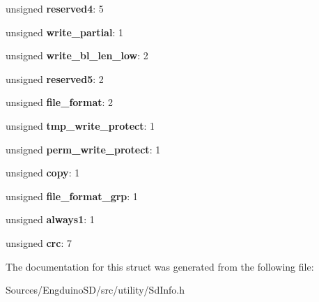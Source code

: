 \begin{DoxyCompactItemize}
\item 
\hypertarget{struct_c_s_d_v1_a8c0aa397613ce7723033f0f8edccf458}{}unsigned {\bfseries reserved4}\+: 5\label{struct_c_s_d_v1_a8c0aa397613ce7723033f0f8edccf458}

\item 
\hypertarget{struct_c_s_d_v1_a24149a92c75ebed1c824e4301e1fad40}{}unsigned {\bfseries write\+\_\+partial}\+: 1\label{struct_c_s_d_v1_a24149a92c75ebed1c824e4301e1fad40}

\item 
\hypertarget{struct_c_s_d_v1_a57c6fb1515a4377af6c642c5d66f7a35}{}unsigned {\bfseries write\+\_\+bl\+\_\+len\+\_\+low}\+: 2\label{struct_c_s_d_v1_a57c6fb1515a4377af6c642c5d66f7a35}

\item 
\hypertarget{struct_c_s_d_v1_ab19ce641d4e1ed12241f3519836c30dc}{}unsigned {\bfseries reserved5}\+: 2\label{struct_c_s_d_v1_ab19ce641d4e1ed12241f3519836c30dc}

\item 
\hypertarget{struct_c_s_d_v1_a537754d4987f7c51d5a67b66d8870cf5}{}unsigned {\bfseries file\+\_\+format}\+: 2\label{struct_c_s_d_v1_a537754d4987f7c51d5a67b66d8870cf5}

\item 
\hypertarget{struct_c_s_d_v1_a79be71efc43a4706a1f1fd6023f574db}{}unsigned {\bfseries tmp\+\_\+write\+\_\+protect}\+: 1\label{struct_c_s_d_v1_a79be71efc43a4706a1f1fd6023f574db}

\item 
\hypertarget{struct_c_s_d_v1_a56bd241d539d5a48b97a64587908e55d}{}unsigned {\bfseries perm\+\_\+write\+\_\+protect}\+: 1\label{struct_c_s_d_v1_a56bd241d539d5a48b97a64587908e55d}

\item 
\hypertarget{struct_c_s_d_v1_a59b32955a2955914ad68a5207da3634e}{}unsigned {\bfseries copy}\+: 1\label{struct_c_s_d_v1_a59b32955a2955914ad68a5207da3634e}

\item 
\hypertarget{struct_c_s_d_v1_a39a7305faa36816b35635cbc6a6810dd}{}unsigned {\bfseries file\+\_\+format\+\_\+grp}\+: 1\label{struct_c_s_d_v1_a39a7305faa36816b35635cbc6a6810dd}

\item 
\hypertarget{struct_c_s_d_v1_a5d5093fb1a3d7414f1f26158cc522339}{}unsigned {\bfseries always1}\+: 1\label{struct_c_s_d_v1_a5d5093fb1a3d7414f1f26158cc522339}

\item 
\hypertarget{struct_c_s_d_v1_a2d5f23ba505a0a139bdc685bd50c2ef1}{}unsigned {\bfseries crc}\+: 7\label{struct_c_s_d_v1_a2d5f23ba505a0a139bdc685bd50c2ef1}

\end{DoxyCompactItemize}


The documentation for this struct was generated from the following file\+:\begin{DoxyCompactItemize}
\item 
Sources/\+Engduino\+S\+D/src/utility/Sd\+Info.\+h\end{DoxyCompactItemize}
